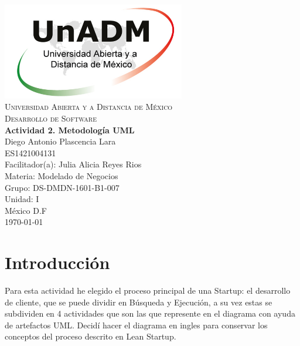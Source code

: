 \documentclass[spanish,12pt,letterpapper]{article}
\begin{document}
	\begin{titlepage}
		\begin{center}
			\includegraphics[width=0.6\textwidth]{./logoUnADM}~\\[1cm] 
			\textsc{Universidad Abierta y a Distancia de México}\\[0.8cm]
			\textsc{Desarrollo de Software}\\[1.8cm]
			
			\textbf{ \Large Actividad 2. Metodología UML}\\[3cm]
			
			Diego Antonio Plascencia Lara\\ ES1421004131 \\[0.4cm]
			Facilitador(a): Julia Alicia Reyes Rios\\
			Materia: Modelado de Negocios\\
			Grupo: DS-DMDN-1601-B1-007 \\
			Unidad: I \\
			
			\vfill México D.F\\{\today}
			
		\end{center}
	\end{titlepage}
	
	\section{Introducción\\}
	Para esta actividad he elegido el proceso principal de una Startup: el desarrollo de cliente, que se puede dividir en Búsqueda y Ejecución, a su vez estas se subdividen en 4 actividades que son las que represente en el diagrama con ayuda de artefactos UML. Decidí hacer el diagrama en ingles para conservar los conceptos del proceso descrito en Lean Startup.\\
	
\end{document}
